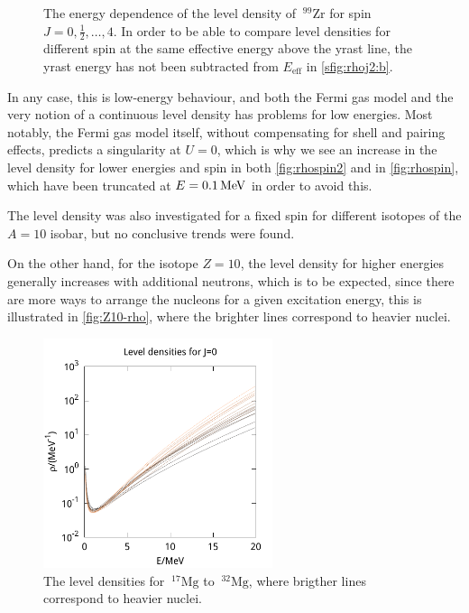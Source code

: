 \begin{figure}
\begin{center}
\begin{tabular}{cc}
\end{tabular}
\caption{\label{fig:rhospin2} The energy dependence of the level density of $~^{99}\mathrm{Zr}$ for spin $J=0,\tfrac{1}{2},\dots, 4$. In order to be able to compare level densities for different spin at the same effective energy above the yrast line, the yrast energy has not been subtracted from $E_\text{eff}$ in \ref{sfig:rhoj2:b}.}
\end{center}
\end{figure}

In any case, this is low-energy behaviour, and both the Fermi gas model\cite{grossjean1985} and the very notion of a continuous level density has problems for low energies. Most notably, the Fermi gas model itself, without compensating for shell and pairing effects, predicts a singularity at $U=0$, which is why we see an increase in the level density for lower energies and spin in both \autoref{fig:rhospin2} and in \autoref{fig:rhospin}, which have been truncated at $E=\unit[0.1]{MeV}$ in order to avoid this.

The level density was also investigated for a fixed spin for different isotopes of the $A=10$ isobar, but no conclusive trends were found.

On the other hand, for the isotope $Z=10$, the level density for higher energies generally increases with additional neutrons, which is to be expected, since there are more ways to arrange the nucleons for a given excitation energy, this is illustrated in \autoref{fig:Z10-rho}, where the brighter lines correspond to heavier nuclei.

\begin{figure}
\begin{center}
\includegraphics[width=0.6\textwidth]{figures/rho/Z10_N7-N22.pdf}
\caption{\label{fig:Z10-rho} The level densities for $~^{17}\mathrm{Mg}$ to $~^{32}\mathrm{Mg}$, where brigther lines correspond to heavier nuclei.}
\end{center}
\end{figure}

